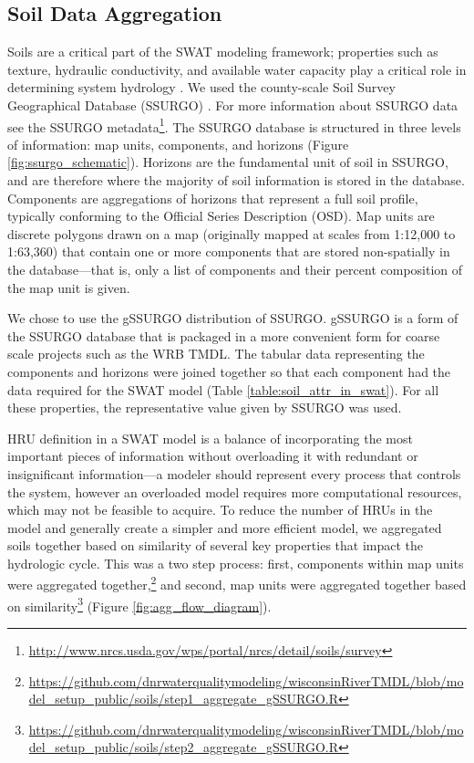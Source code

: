 \subsection{Soil Data Aggregation}\label{sec:soils}

Soils are a critical part of the SWAT modeling framework; properties such as texture, hydraulic conductivity, and
available water capacity play a critical role in determining system hydrology
. We used the county-scale Soil Survey Geographical
Database (SSURGO) . For more information about SSURGO
data see the SSURGO metadata\footnote{\url{http://www.nrcs.usda.gov/wps/portal/nrcs/detail/soils/survey}}.
The SSURGO database is structured in three levels of information: map units,
components, and horizons (Figure \ref{fig:ssurgo_schematic}). Horizons are the fundamental unit of soil in SSURGO, and are therefore where the majority of soil information is stored in the database.
Components are aggregations of horizons that represent a full soil profile,
typically conforming to the Official Series Description (OSD). Map units
are discrete polygons drawn on a map (originally mapped at scales from 1:12,000
to 1:63,360) that contain one or more components that are stored non-spatially
in the database---that is, only a list of components and their percent
composition of the map unit is given. 

We chose to use the gSSURGO distribution of SSURGO. gSSURGO is a form of the SSURGO database that is packaged in a more convenient form for coarse scale projects such as the WRB TMDL. The tabular data representing the components and
horizons were joined together so that each component had the data required for
the SWAT model (Table \ref{table:soil_attr_in_swat}). For all these properties, the representative value given by
SSURGO was used.

HRU definition in a SWAT model is a balance of incorporating the most important
pieces of information without overloading it with redundant or insignificant
information---a modeler should represent every process that controls the system,
however an overloaded model requires more computational resources, which may not
be feasible to acquire. To reduce the number of HRUs in the model and generally create a 
simpler and more efficient model, we aggregated
soils together based on similarity of several key properties that impact the
hydrologic cycle. This was a two step process: first, components within map
units were aggregated
together,\footnote{\url{https://github.com/dnrwaterqualitymodeling/wisconsinRiverTMDL/blob/model_setup_public/soils/step1_aggregate_gSSURGO.R} } 
and second, map units were aggregated together based on
similarity\footnote{\url{https://github.com/dnrwaterqualitymodeling/wisconsinRiverTMDL/blob/model_setup_public/soils/step2_aggregate_gSSURGO.R}} (Figure \ref{fig:agg_flow_diagram}).

